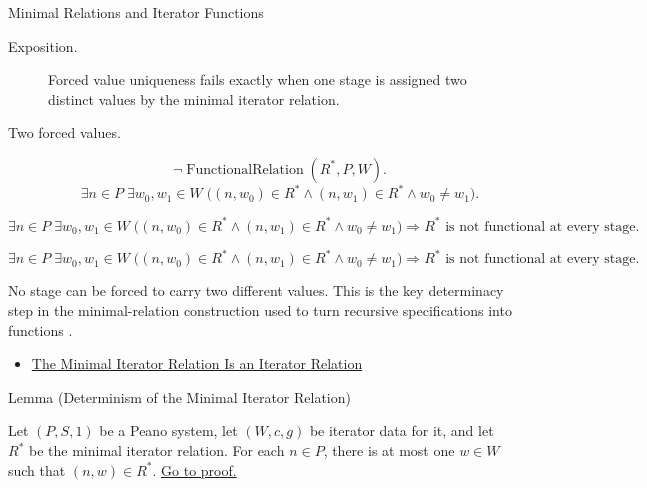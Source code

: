 \begin{topicbox}{Minimal Relations and Iterator Functions}
\begin{remark*}
\begin{description}
  \item[Exposition.]
  Forced value uniqueness fails exactly when one stage is assigned two
  distinct values by the minimal iterator relation.
  \item[Two forced values.]
  \[
  \neg\operatorname{FunctionalRelation}(R^*,P,W).
  \]
  \[
  \exists n\in P\;\exists w_0,w_1\in W\;
  \bigl((n,w_0)\in R^*\land (n,w_1)\in R^*\land w_0\neq w_1\bigr).
  \]
\end{description}
\end{remark*}

\begin{remark*}
\[
\exists n\in P\;\exists w_0,w_1\in W\;
\bigl((n,w_0)\in R^*\land (n,w_1)\in R^*\land w_0\neq w_1\bigr)
\Longrightarrow
R^* \text{ is not functional at every stage}.
\]
\end{remark*}

\begin{remark*}
\[
\exists n\in P\;\exists w_0,w_1\in W\;
\bigl((n,w_0)\in R^*\land (n,w_1)\in R^*\land w_0\neq w_1\bigr)
\Longrightarrow
R^* \text{ is not functional at every stage}.
\]
\end{remark*}

\begin{remark*}[Interpretation]
No stage can be forced to carry two different values. This is the key
determinacy step in the minimal-relation construction used to turn recursive
specifications into functions \citep{FefermanNumberSystems1964}.
\end{remark*}

\begin{dependencies}
\begin{itemize}
  \item \hyperref[lem:iterator-relation-consistency]{The Minimal Iterator Relation Is an Iterator Relation}
\end{itemize}
\end{dependencies}

\begin{lemmabox}{Lemma (Determinism of the Minimal Iterator Relation)}
\begin{lemma}
\label{lem:minimal-iterator-relation-deterministic}
Let $(P,S,1)$ be a Peano system, let $(W,c,g)$ be iterator data for it, and let
$R^*$ be the minimal iterator relation. For each $n\in P$, there is at most one
$w\in W$ such that $(n,w)\in R^*$.
\hyperref[prf:minimal-iterator-relation-deterministic]{Go to proof.}
\end{lemma}
\end{lemmabox}


\end{topicbox}
